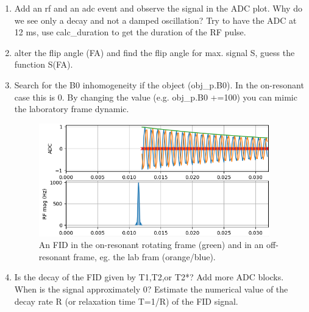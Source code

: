 \documentclass[a4paper,12pt]{extarticle}
\begin{document}
\begin{enumerate}

\item 	Add an rf and an adc event and observe the signal in the ADC plot. Why do we see only a decay and not a damped oscillation?  Try to have the ADC at 12 ms, use calc\_duration to get the duration of the RF pulse.
		
\item 	alter the flip angle (FA) and find the flip angle for max. signal S, guess the function S(FA).
		
		
\item  Search for the B0 inhomogeneity if the object (obj\_p.B0). In the on-resonant case this is 0. By changing the value (e.g. obj\_p.B0 +=100) you can mimic the laboratory frame dynamic. 
\begin{figure}[H] 
\centering
\includegraphics[width=10cm]{img/exA1_FID.png}
\caption{An FID in the on-resonant rotating frame (green) and in an off-resonant frame, eg. the lab fram (orange/blue). } \label{fig:exA4_STE}
\end{figure}


\item  Is the decay of the FID given by T1,T2,or T2*? Add more ADC blocks. When is the signal approximately 0?  Estimate the numerical value of the decay rate R (or relaxation time T=1/R) of the FID signal.


\end{enumerate}
\end{document}
